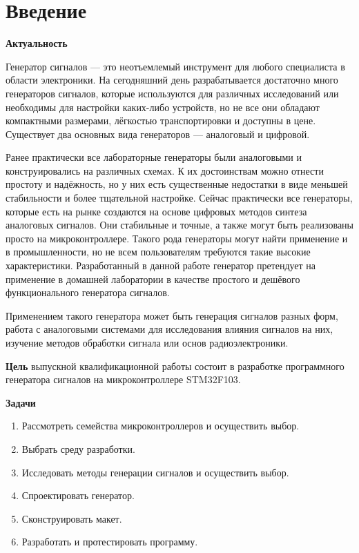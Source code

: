 \chapter*{Введение}

\textbf{Актуальность}

	Генератор сигналов --- это неотъемлемый инструмент для любого специалиста в области электроники. На сегодняшний день разрабатывается достаточно много генераторов сигналов, которые используются для различных исследований или необходимы для настройки каких-либо устройств, но не все они обладают компактными размерами, лёгкостью транспортировки и доступны в цене. Существует два основных вида генераторов --- аналоговый и цифровой.
	
	Ранее практически все лабораторные генераторы были аналоговыми и конструировались на различных схемах. К их достоинствам можно отнести простоту и надёжность, но у них есть существенные недостатки в виде меньшей стабильности и более тщательной настройке. Сейчас практически все генераторы, которые есть на рынке создаются на основе цифровых методов синтеза аналоговых сигналов. %
	 Они стабильные и точные, а также могут быть реализованы просто на микроконтроллере. Такого рода генераторы могут найти применение и в промышленности, но не всем пользователям требуются такие высокие характеристики. Разработанный в данной работе генератор претендует на применение в домашней лаборатории в качестве простого и дешёвого функционального генератора сигналов.
	
	Применением такого генератора может быть генерация сигналов разных форм, работа с аналоговыми системами для исследования влияния сигналов на них, изучение методов обработки сигнала или основ радиоэлектроники. 
	
\textbf{Цель}
выпускной квалификационной работы состоит в разработке программного генератора сигналов на микроконтроллере STM32F103.

\textbf{Задачи}

\begin{enumerate}
\item Рассмотреть семейства микроконтроллеров и осуществить выбор.
\item Выбрать среду разработки.
\item Исследовать методы генерации сигналов и осуществить выбор.
\item Спроектировать генератор.
\item Сконструировать макет.
\item Разработать и протестировать программу.
\end{enumerate}

